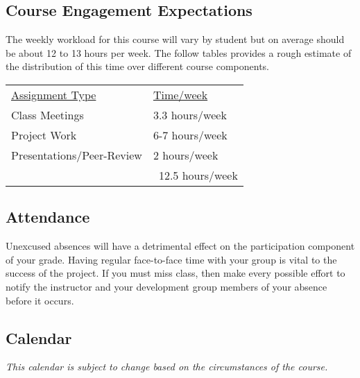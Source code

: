 \documentclass[10pt]{article}
\begin{document}
\subsection{Course Engagement Expectations}

The weekly workload for this course will vary by student but on average should be about 12 to 13 hours per week.  The follow tables provides a rough estimate of the distribution of this time over different course components.
\begin{center}
\begin{tabular}{ll}
\underline{Assignment Type} & \underline{Time/week} \\
Class Meetings       & 3.3 hours/week \\
Project Work          & 6-7 hours/week \\
Presentations/Peer-Review   & 2 hours/week \\
\bottomrule
 & ~12.5 hours/week
\end{tabular}
\end{center}

\subsection{Attendance}

Unexcused absences will have a detrimental effect on the participation component of your grade. Having regular face-to-face time with your group is vital to the success of the project. If you must miss class, then make every possible effort to notify the instructor and your development group members of your absence before it occurs.

\subsection{Calendar}

\textit{This calendar is subject to change based on the circumstances of the course.}
\end{document}
